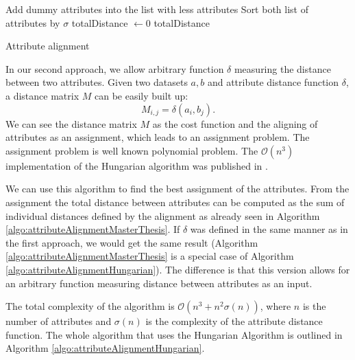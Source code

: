 \documentclass{article}
\newcommand{\attributeDistance}{\delta}
\begin{document}
\begin{refsegment}
\IncMargin{1em}
\begin{algorithm}
	\BlankLine
	Add dummy attributes into the list with less attributes\;
	Sort both list of attributes by $\sigma$\;
	totalDistance $\leftarrow 0$\;
	\Return totalDistance\;
	\caption{Attribute alignment}
	\label{algo:attributeAlignmentMasterThesis}
\end{algorithm}\DecMargin{1em}

In our second approach, we allow arbitrary function $\attributeDistance$ measuring the distance between two attributes. Given two datasets $a,b$ and attribute distance function $\attributeDistance$, a distance matrix $M$ can be easily built up:
\begin{equation}
M_{i,j} = \attributeDistance(a_i,b_j).	
\end{equation}
We can see the distance matrix $M$ as the cost function and the aligning of attributes as an assignment, which leads to an assignment problem. The assignment problem is well known polynomial problem. The $\mathcal{O}(n^3)$ implementation of the Hungarian algorithm was published in \cite{KarpHungarian}.

We can use this algorithm to find the best assignment of the attributes. From the assignment the total distance between attributes can be computed as the sum of individual distances defined by the alignment as already seen in Algorithm \ref{algo:attributeAlignmentMasterThesis}. If  $\attributeDistance$ was defined in the same manner as in the first approach, we would get the same result (Algorithm \ref{algo:attributeAlignmentMasterThesis} is a special case of Algorithm \ref{algo:attributeAlignmentHungarian}). The difference is that this version allows for an arbitrary function measuring distance between attributes as an input.

 The total complexity of the algorithm is $\mathcal{O}(n^3+n^2\sigma(n))$, where $n$ is the number of attributes and $\sigma(n)$ is the complexity of the attribute distance function. The whole algorithm that uses the Hungarian Algorithm is outlined in Algorithm \ref{algo:attributeAlignmentHungarian}.


\end{refsegment}
\end{document}
